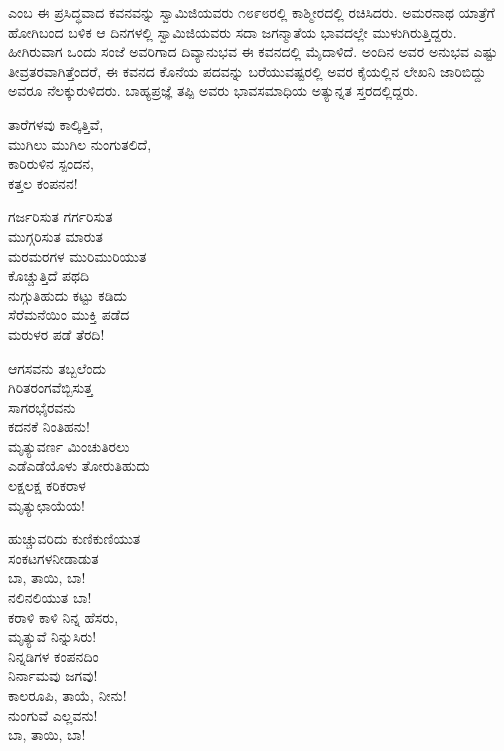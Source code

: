  ಎಂಬ ಈ ಪ್ರಸಿದ್ಧವಾದ ಕವನವನ್ನು ಸ್ವಾಮಿಜಿಯವರು ೧೮೯೮ರಲ್ಲಿ ಕಾಶ್ಮೀರದಲ್ಲಿ ರಚಿಸಿದರು. ಅಮರನಾಥ ಯಾತ್ರೆಗೆ ಹೋಗಿಬಂದ ಬಳಿಕ ಆ ದಿನಗಳಲ್ಲಿ ಸ್ವಾಮಿಜಿಯವರು ಸದಾ ಜಗನ್ಮಾತೆಯ ಭಾವದಲ್ಲೇ ಮುಳುಗಿರುತ್ತಿದ್ದರು. ಹೀಗಿರುವಾಗ ಒಂದು ಸಂಜೆ ಅವರಿಗಾದ ದಿವ್ಯಾನುಭವ ಈ ಕವನದಲ್ಲಿ ಮೈದಾಳಿದೆ. ಅಂದಿನ ಅವರ ಅನುಭವ ಎಷ್ಟು ತೀವ್ರತರವಾಗಿತ್ತೆಂದರೆ, ಈ ಕವನದ ಕೊನೆಯ ಪದವನ್ನು ಬರೆಯುವಷ್ಟರಲ್ಲಿ ಅವರ ಕೈಯಲ್ಲಿನ ಲೇಖನಿ ಜಾರಿಬಿದ್ದು ಅವರೂ ನೆಲಕ್ಕುರುಳಿದರು. ಬಾಹ್ಯಪ್ರಜ್ಞೆ ತಪ್ಪಿ ಅವರು ಭಾವಸಮಾಧಿಯ ಅತ್ಯುನ್ನತ ಸ್ತರದಲ್ಲಿದ್ದರು.

\begin{myquote}
ತಾರೆಗಳವು ಕಾಲ್ಕಿತ್ತಿವೆ,\\ಮುಗಿಲು ಮುಗಿಲ ನುಂಗುತಲಿದೆ,\\ಕಾರಿರುಳಿನ ಸ್ಪಂದನ,\\ಕತ್ತಲ ಕಂಪನನ!
\end{myquote}

\begin{myquote}
ಗರ್ಜರಿಸುತ ಗರ್ಗರಿಸುತ\\ಮುಗ್ಗರಿಸುತ ಮಾರುತ\\ಮರಮರಗಳ ಮುರಿಮುರಿಯುತ\\ಕೊಚ್ಚುತ್ತಿದೆ ಪಥದಿ\\ನುಗ್ಗುತಿಹುದು ಕಟ್ಟು ಕಡಿದು\\ಸೆರೆಮನೆಯಿಂ ಮುಕ್ತಿ ಪಡೆದ\\ಮರುಳರ ಪಡೆ ತೆರದಿ!
\end{myquote}

\begin{myquote}
ಆಗಸವನು ತಬ್ಬಲೆಂದು\\ಗಿರಿತರಂಗವೆಬ್ಬಿಸುತ್ತ\\ಸಾಗರಭೈರವನು\\ಕದನಕೆ ನಿಂತಿಹನು!\\ಮೃತ್ಯುವರ್ಣ ಮಿಂಚುತಿರಲು\\ಎಡೆಎಡೆಯೊಳು ತೋರುತಿಹುದು\\ಲಕ್ಷಲಕ್ಷ ಕರಿಕರಾಳ\\ಮೃತ್ಯುಛಾಯೆಯ!
\end{myquote}

\begin{myquote}
ಹುಚ್ಚುವರಿದು ಕುಣಿಕುಣಿಯುತ\\ಸಂಕಟಗಳನೀಡಾಡುತ\\ಬಾ, ತಾಯಿ, ಬಾ!\\ನಲಿನಲಿಯುತ ಬಾ!\\ಕರಾಳಿ ಕಾಳಿ ನಿನ್ನ ಹೆಸರು,\\ಮೃತ್ಯುವೆ ನಿನ್ನುಸಿರು!\\ನಿನ್ನಡಿಗಳ ಕಂಪನದಿಂ\\ನಿರ್ನಾಮವು ಜಗವು!\\ಕಾಲರೂಪಿ, ತಾಯೆ, ನೀನು!\\ನುಂಗುವೆ ಎಲ್ಲವನು!\\ಬಾ, ತಾಯಿ, ಬಾ!
\end{myquote}

